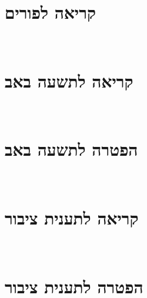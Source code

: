 \begin{footnotesize}
\\

\section[פורים]{קריאה לפורים}

\\

\section[תשעה באב]{קריאה לתשעה באב}

	\\


\section*{הפטרה לתשעה באב}

	 \\
	

\section[תענית ציבור]{קריאה לתענית ציבור}\label{torah taanis tzibbur}

	\\


\section*{הפטרה לתענית ציבור}


\end{footnotesize}
